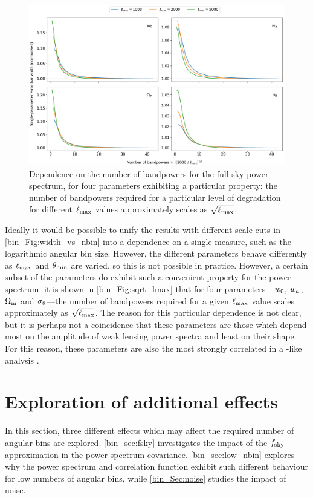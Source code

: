 \begin{figure}[t]
\includegraphics[width=\textwidth]{sqrt_lmax}
\caption{Dependence on the number of bandpowers for the full-sky power spectrum, for four parameters exhibiting a particular property: the number of bandpowers required for a particular level of degradation for different $\ell_\text{max}$ values approximately scales as $\sqrt{\ell_\text{max}}$.}
\label{bin_Fig:sqrt_lmax}
\end{figure}

Ideally it would be possible to unify the results with different scale cuts in \autoref{bin_Fig:width_vs_nbin} into a dependence on a single measure, such as the logarithmic angular bin size. However, the different parameters behave differently as $\ell_\text{max}$ and $\theta_\text{min}$ are varied, so this is not possible in practice. However, a certain subset of the parameters do exhibit such a convenient property for the power spectrum: it is shown in \autoref{bin_Fig:sqrt_lmax} that for four parameters---$w_0$, $w_a$, $\Omega_\text{m}$ and $\sigma_8$---the number of bandpowers required for a given $\ell_\text{max}$ value scales approximately as $\sqrt{\ell_\text{max}}$. The reason for this particular dependence is not clear, but it is perhaps not a coincidence that these parameters are those which depend most on the amplitude of weak lensing power spectra and least on their shape. For this reason, these parameters are also the most strongly correlated in a \Euclid{}-like analysis \citep{Blanchard2020}.

\section{Exploration of additional effects}
\label{bin_sec:additional_effects}

In this section, three different effects which may affect the required number of angular bins are explored. \autoref{bin_sec:fsky} investigates the impact of the $f_\text{sky}$ approximation in the power spectrum covariance. \autoref{bin_sec:low_nbin} explores why the power spectrum and correlation function exhibit such different behaviour for low numbers of angular bins, while \autoref{bin_Sec:noise} studies the impact of noise.

